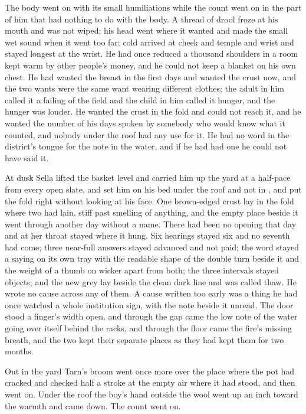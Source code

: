 The body went on with its small humiliations while the count went on in the part of him that had nothing to do with the body. A thread of drool froze at his mouth and was not wiped; his head went where it wanted and made the small wet sound when it went too far; cold arrived at cheek and temple and wrist and stayed longest at the wrist. He had once reduced a thousand shoulders in a room kept warm by other people's money, and he could not keep a blanket on his own chest. He had wanted the breast in the first days and wanted the crust now, and the two wants were the same want wearing different clothes; the adult in him called it a failing of the field and the child in him called it hunger, and the hunger was louder. He wanted the crust in the fold and could not reach it, and he wanted the number of his days spoken by somebody who would know what it counted, and nobody under the roof had any use for it. He had no word in the district's tongue for the note in the water, and if he had had one he could not have said it.

At dusk Sella lifted the basket level and carried him up the yard at a half-pace from every open slate, and set him on his bed under the roof and not in , and put the fold right without looking at his face. One brown-edged crust lay in the fold where two had lain, stiff past smelling of anything, and the empty place beside it went through another day without a name. There had been no opening that day and  at her throat stayed where it hung. Six hearings stayed six and no seventh had come; three near-full answers stayed advanced and not paid; the word stayed a saying on its own tray with the readable shape of the double turn beside it and the weight of a thumb on wicker apart from both; the three intervals stayed objects; and the new grey lay beside the clean dark line and was called thaw. He wrote no cause across any of them. A cause written too early was a thing he had once watched a whole institution sign, with the note beside it unread. The door stood a finger's width open, and through the gap came the low note of the water going over itself behind the racks, and through the floor came the fire's missing breath, and the two kept their separate places as they had kept them for two months.

Out in the yard Tarn's broom went once more over the place where the pot had cracked and checked half a stroke at the empty air where it had stood, and then went on. Under the roof the boy's hand outside the wool went up an inch toward the warmth and came down. The count went on.
